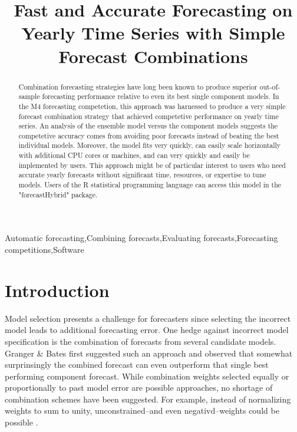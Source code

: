 \documentclass[11pt,3p,review,authoryear]{elsarticle}
\begin{document}
\begin{frontmatter}

\title{Fast and Accurate Forecasting on Yearly Time Series with Simple Forecast Combinations}





\begin{abstract}
Combination forecasting strategies have long been known to produce superior out-of-sample forecasting performance relative to even its best single component models. In the M4 forecasting competetion, this approach was harnessed to produce a very simple forecast combination strategy that achieved competetive performance on yearly time series. An analysis of the ensemble model versus the component models suggests the competetive accuracy comes from avoiding poor forecasts instead of beating the best individual models. Moreover, the model fits very quickly, can easily scale horizontally with additional CPU cores or machines, and can very quickly and easily be implemented by users. This approach might be of particular interest to users who need accurate yearly forecasts without significant time, resources, or expertise to tune models. Users of the R statistical programming language can access this model in the "forecastHybrid" package.
\end{abstract}

\begin{keyword}
Automatic forecasting\sep Combining forecasts\sep Evaluating forecasts\sep Forecasting competitions\sep Software
\end{keyword}

\end{frontmatter}


\section{Introduction}
Model selection presents a challenge for forecasters since selecting the incorrect model leads to additional forecasting error. One hedge against incorrect model specification is the combination of forecasts from several candidate models. Granger \& Bates \cite{GrangerBates1964} first suggested such an approach and observed that somewhat surprinsingly the combined forecast can even outperform that single best performing component forecast. While combination weights selected equally or proportionally to past model error are possible approaches, no shortage of combination schemes have been suggested. For example, instead of normalizing weights to sum to unity, unconstrained--and even negativd--weights could be possible \citep{GrangerRamanathan1984}.
\end{document}
